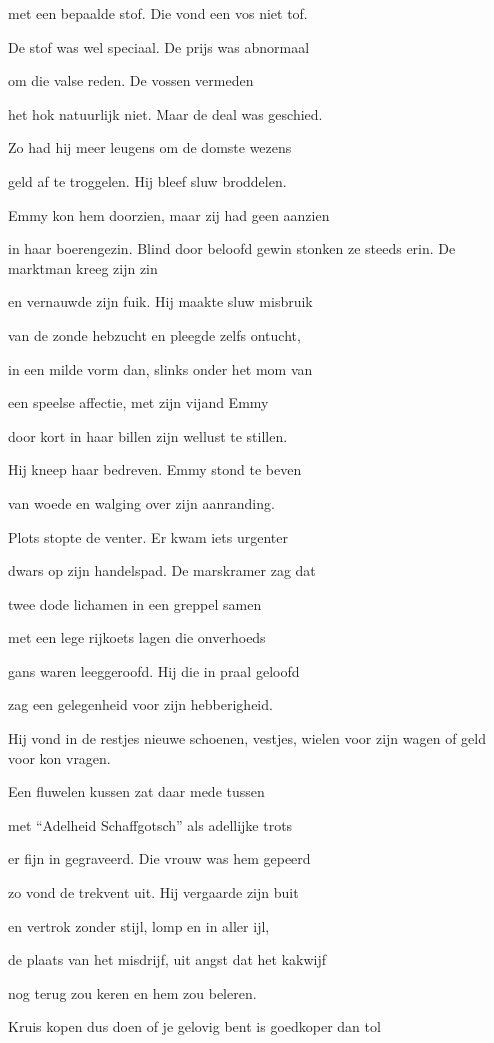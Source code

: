 met een bepaalde stof.
Die vond een vos niet tof.

De stof was wel speciaal.
De prijs was abnormaal

om die valse reden.
De vossen vermeden

het hok natuurlijk niet.
Maar de deal was geschied.

Zo had hij meer leugens
om de domste wezens

geld af te troggelen.
Hij bleef sluw broddelen.

Emmy kon hem doorzien,
maar zij had geen aanzien

in haar boerengezin.
Blind door beloofd gewin
stonken ze steeds erin.
De marktman kreeg zijn zin

en vernauwde zijn fuik.
Hij maakte sluw misbruik

van de zonde hebzucht
en pleegde zelfs ontucht,

in een milde vorm dan,
slinks onder het mom van

een speelse affectie,
met zijn vijand Emmy

door kort in haar billen
zijn wellust te stillen.

Hij kneep haar bedreven.
Emmy stond te beven

van woede en walging
over zijn aanranding.

Plots stopte de venter.
Er kwam iets urgenter

dwars op zijn handelspad.
De marskramer zag dat

twee dode lichamen
in een greppel samen

met een lege rijkoets
lagen die onverhoeds

gans waren leeggeroofd.
Hij die in praal geloofd

zag een gelegenheid
voor zijn hebberigheid.

Hij vond in de restjes
nieuwe schoenen, vestjes,
wielen voor zijn wagen
of geld voor kon vragen.

Een fluwelen kussen
zat daar mede tussen

met “Adelheid Schaffgotsch”
als adellijke trots

er fijn in gegraveerd.
Die vrouw was hem gepeerd

zo vond de trekvent uit.
Hij vergaarde zijn buit

en vertrok zonder stijl,
lomp en in aller ijl,

de plaats van het misdrijf,
uit angst dat het kakwijf

nog terug zou keren
en hem zou beleren.

Kruis kopen dus doen of je gelovig bent is goedkoper dan tol
